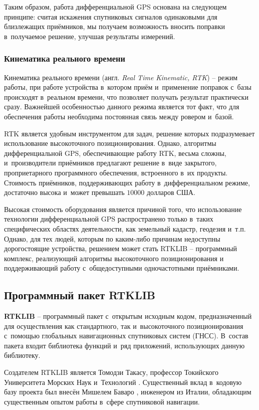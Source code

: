 Таким образом, работа дифференциальной GPS основана на следующем принципе: считая искажения спутниковых сигналов одинаковыми для близлежащих приёмников, мы получаем возможность вносить поправки в~получаемое решение, улучшая результаты измерений.

\subsubsection{Кинематика реального времени}
\label{subsec:rtk}

Кинематика реального времени (англ. \emph{Real Time Kinematic, RTK}) -- режим работы, при работе устройства в~котором приём и~применение поправок с~базы происходят в~реальном времени, что позволяет получать результат практически сразу. Важнейшей особенностью данного режима является тот факт, что для обеспечения работы необходима постоянная связь между ровером и~базой.

RTK является удобным инструментом для задач, решение которых подразумевает использование высокоточного позиционирования. Однако, алгоритмы дифференциальной GPS, обеспечивающие работу RTK, весьма сложны, и~производители приёмников предлагают решение в~виде закрытого, проприетарного программного обеспечения, встроенного в~их продукты. Стоимость приёмников, поддерживающих работу в~дифференциальном режиме, достаточно высока и~может превышать $10000$ долларов США.

Высокая стоимость оборудования является причиной того, что использование технологии дифференциальной GPS распространено только в~таких специфических областях деятельности, как земельный кадастр, геодезия и~т.п. Однако, для тех людей, которым по каким-либо причинам недоступны дорогостоящие устройства, решением может стать RTKLIB -- программный комплекс, реализующий алгоритмы высокоточного позиционирования и поддерживающий работу с~общедоступными одночастотными приёмниками.

\subsection{Программный пакет RTKLIB}
\label{subsec:rtklib}

\textbf{RTKLIB} -- программный пакет с~открытым исходным кодом, предназначенный для осуществления как стандартного, так и~высокоточного позиционирования с~помощью глобальных навигационных спутниковых систем (ГНСС). В~состав пакета входит библиотека функций и~ряд приложений, использующих данную библиотеку.

Создателем RTKLIB является Томодзи Такасу, профессор Токийского Университета Морских Наук и~Технологий \cite{RTKLIB}. Существенный вклад в~кодовую базу проекта был внесён Мишелем Баваро \cite{RTKLIB,Bavaro}, инженером из Италии, обладающим существенным опытом работы в~сфере спутниковой навигации.

